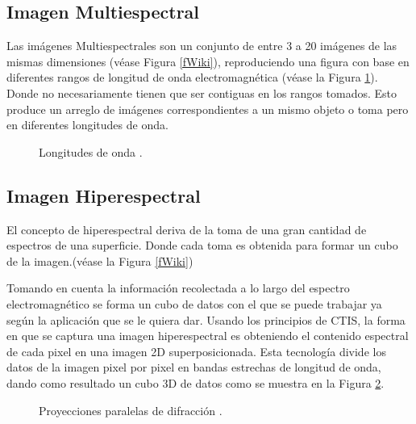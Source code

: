 \subsection{Imagen Multiespectral}
Las imágenes Multiespectrales son un conjunto de entre 3 a 20 imágenes de las mismas dimensiones (véase Figura \ref{fWiki}), reproduciendo una figura con base en diferentes rangos de longitud de onda electromagnética (véase la Figura \ref{fJairo}). Donde no necesariamente tienen que ser contiguas en los rangos tomados. Esto produce un arreglo de imágenes correspondientes a un mismo objeto o toma pero en diferentes longitudes de onda.

\begin{figure}[h]
  \centering
  \centering
  \caption{Longitudes de onda \cite{FuzzyVD}.}
  \label{fJairo}
\end{figure}

\subsection{Imagen Hiperespectral}
El concepto de hiperespectral deriva de la toma de una gran cantidad de espectros de una superficie. Donde cada toma es obtenida para formar un cubo de la imagen.(véase la Figura \ref{fWiki})

Tomando en cuenta la información recolectada a lo largo del espectro electromagnético se forma un cubo de datos con el que se puede trabajar ya según la aplicación que se le quiera dar. Usando los principios de CTIS, la forma en que se captura una imagen hiperespectral es obteniendo el contenido espectral de cada pixel en una imagen 2D superposicionada. Esta tecnología divide los datos de la imagen pixel por pixel en bandas estrechas de longitud de onda, dando como resultado un cubo 3D de datos como se muestra en la Figura \ref{fPaper1}.\\

\begin{figure}[h]
  \centering
  \centering
  \caption{Proyecciones paralelas de difracción \cite{PracCam}.}
  \label{fPaper1}
\end{figure}

